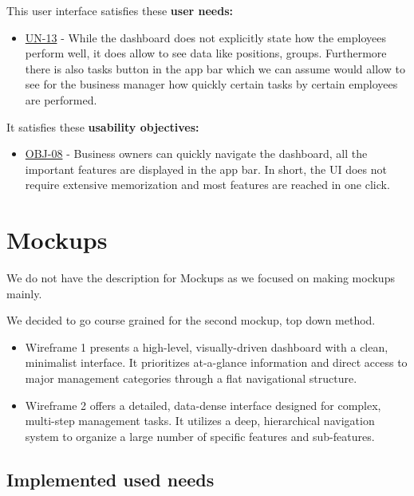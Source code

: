 \documentclass[]{VUMIFTemplateClass}
\begin{document}
This user interface satisfies these \textbf{user needs:}

\begin{itemize}
    \item \hyperref[UN-13]{UN-13} - While the dashboard does not explicitly state how the employees perform well, it does allow to see data like positions, groups. Furthermore there is also tasks button in the app bar which we can assume would allow to see for the business manager how quickly certain tasks by certain employees are performed.
\end{itemize}

It satisfies these \textbf{usability objectives:}

\begin{itemize}
    \item \hyperref[OBJ-08]{OBJ-08} - Business owners can quickly navigate the dashboard, all the important features are displayed in the app bar. In short, the UI does not require extensive memorization and most features are reached in one click.
\end{itemize}

\section{Mockups}

We do not have the description for Mockups as we focused on making mockups mainly. 

We decided to go course grained for the second mockup, top down method. 

\begin{itemize}
    \item Wireframe 1 presents a high-level, visually-driven dashboard with a clean, minimalist interface. It prioritizes at-a-glance information and direct access to major management categories through a flat navigational structure.
    \item Wireframe 2 offers a detailed, data-dense interface designed for complex, multi-step management tasks. It utilizes a deep, hierarchical navigation system to organize a large number of specific features and sub-features.
\end{itemize}

\subsection{Implemented used needs}

\end{document}
